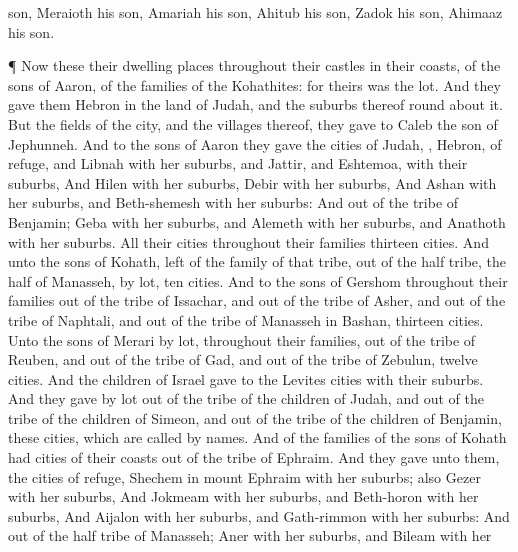 {son,
Meraioth his
son,
Amariah his
son,
Ahitub his
son,
Zadok his
son,
Ahimaaz his
son.
\par }{\PP {}¶ Now these
{} their dwelling
places throughout their
castles in their
coasts, of the
sons of
Aaron, of the
families of the
Kohathites: for theirs was the
lot.
And they
gave them
Hebron in the
land of
Judah, and the
suburbs thereof round
about it.
But the
fields of the
city, and the
villages thereof, they
gave to
Caleb the
son of
Jephunneh.
And to the
sons of
Aaron they
gave the
cities of Judah,
{},
Hebron,
{} of
refuge, and
Libnah with her
suburbs, and
Jattir, and
Eshtemoa, with their
suburbs,
And
Hilen with her
suburbs,
Debir with her
suburbs,
And
Ashan with her
suburbs, and
Beth-shemesh with her
suburbs:
And out of the
tribe of
Benjamin;
Geba with her
suburbs, and
Alemeth with her
suburbs, and
Anathoth with her
suburbs. All their
cities throughout their
families
{}
thirteen
cities.
And unto the
sons of
Kohath,
{}
left of the
family of that
tribe,
{} out of the
half
tribe,
{} the
half
{} of
Manasseh, by
lot,
ten
cities.
And to the
sons of
Gershom throughout their
families out of the
tribe of
Issachar, and out of the
tribe of
Asher, and out of the
tribe of
Naphtali, and out of the
tribe of
Manasseh in
Bashan,
thirteen
cities.
Unto the
sons of
Merari
{} by
lot, throughout their
families, out of the
tribe of
Reuben, and out of the
tribe of
Gad, and out of the
tribe of
Zebulun,
twelve
cities.
And the
children of
Israel
gave to the
Levites
{}
cities with their
suburbs.
And they
gave by
lot out of the
tribe of the
children of
Judah, and out of the
tribe of the
children of
Simeon, and out of the
tribe of the
children of
Benjamin, these
cities, which are
called by
{}
names.
And
{} of the
families of the
sons of
Kohath had
cities of their
coasts out of the
tribe of
Ephraim.
And they
gave unto them,
{} the
cities of
refuge,
Shechem in
mount
Ephraim with her
suburbs;
{} also
Gezer with her
suburbs,
And
Jokmeam with her
suburbs, and
Beth-horon with her
suburbs,
And
Aijalon with her
suburbs, and
Gath-rimmon with her
suburbs:
And out of the
half
tribe of
Manasseh;
Aner with her
suburbs, and
Bileam with her
}
